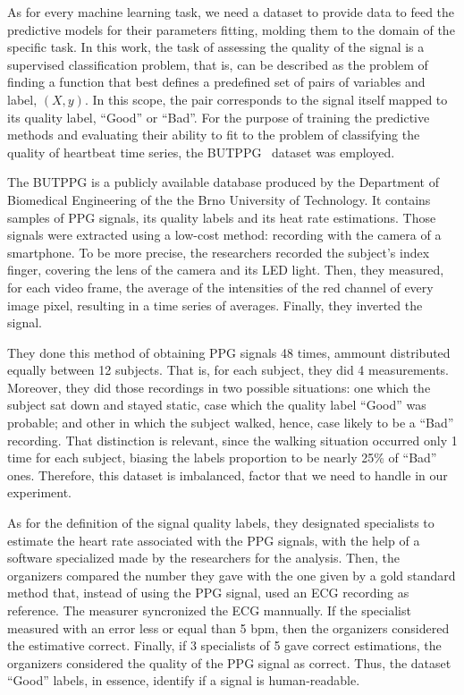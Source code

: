 As for every machine learning task, we need a dataset to provide data to feed the predictive models for their parameters fitting, molding them to the domain of the specific task. In this work, the task of assessing the quality of the signal is a supervised classification problem, that is, can be described as the problem of finding a function that best defines a predefined set of pairs of variables and label, $(X,y)$. In this scope, the pair corresponds to the signal itself mapped to its quality label, ``Good'' or ``Bad''. For the purpose of training the predictive methods and evaluating their ability to fit to the problem of classifying the quality of heartbeat time series, the \gls{BUTPPG}~\cite{butppg} dataset was employed.

%

The \gls{BUTPPG} is a publicly available database produced by the Department of Biomedical Engineering of the the Brno University of Technology. It contains samples of \gls{PPG} signals, its quality labels and its heat rate estimations. Those signals were extracted using a low-cost method: recording with the camera of a smartphone. To be more precise, the researchers recorded the subject's index finger, covering the lens of the camera and its \gls{LED} light. Then, they measured, for each video frame, the average of the intensities of the red channel of every image pixel, resulting in a time series of averages. Finally, they inverted the signal. %

They done this method of obtaining \gls{PPG} signals  48 times, ammount distributed equally between 12 subjects. That is, for each subject, they did 4 measurements. Moreover, they did those recordings in two possible situations: one which the subject sat down and stayed static, case which the quality label ``Good'' was probable; and other in which the subject walked, hence, case likely to be a ``Bad'' recording. That distinction is relevant, since the walking situation occurred only 1 time for each subject, biasing the labels proportion to be nearly 25\% of ``Bad'' ones. Therefore, this dataset is imbalanced, factor that we need to handle in our experiment.

As for the definition of the signal quality labels, they designated specialists to estimate the heart rate associated with the \gls{PPG} signals, with the help of a software specialized made by the researchers for the analysis. Then, the organizers compared the number they gave with the one given by a gold standard method that, instead of using the \gls{PPG} signal, used an ECG recording as reference. The measurer syncronized the ECG mannually. If the specialist measured with an error less or equal than 5 bpm, then the organizers considered the estimative correct. Finally, if 3 specialists of 5 gave correct estimations, the organizers considered the quality of the \gls{PPG} signal as correct. Thus, the dataset ``Good'' labels, in essence, identify if a signal is human-readable. 

